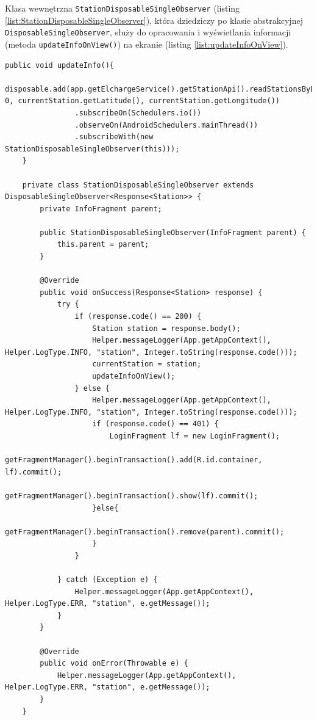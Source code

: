 Klasa wewnętrzna \texttt{StationDisposableSingleObserver} (listing \ref{list:StationDisposableSingleObserver}), która dziedziczy po klasie abstrakcyjnej \texttt{DisposableSingleObserver}, służy do opracowania i wyświetlania informacji (metoda \texttt{updateInfoOnView()}) na ekranie (listing \ref{list:updateInfoOnView}).
\begin{lstlisting}[label=list:StationDisposableSingleObserver,caption=Wczytanie danych stacji z części serwerowej,basicstyle=\tiny\ttfamily]
    public void updateInfo(){
        disposable.add(app.getElchargeService().getStationApi().readStationsByLatAndLng(0, 0, currentStation.getLatitude(), currentStation.getLongitude())
                .subscribeOn(Schedulers.io())
                .observeOn(AndroidSchedulers.mainThread())
                .subscribeWith(new StationDisposableSingleObserver(this)));
    }

    private class StationDisposableSingleObserver extends DisposableSingleObserver<Response<Station>> {
        private InfoFragment parent;

        public StationDisposableSingleObserver(InfoFragment parent) {
            this.parent = parent;
        }

        @Override
        public void onSuccess(Response<Station> response) {
            try {
                if (response.code() == 200) {
                    Station station = response.body();
                    Helper.messageLogger(App.getAppContext(), Helper.LogType.INFO, "station", Integer.toString(response.code()));
                    currentStation = station;
                    updateInfoOnView();
                } else {
                    Helper.messageLogger(App.getAppContext(), Helper.LogType.INFO, "station", Integer.toString(response.code()));
                    if (response.code() == 401) {
                        LoginFragment lf = new LoginFragment();
                        getFragmentManager().beginTransaction().add(R.id.container, lf).commit();
                        getFragmentManager().beginTransaction().show(lf).commit();
                    }else{
                        getFragmentManager().beginTransaction().remove(parent).commit();
                    }
                }

            } catch (Exception e) {
                Helper.messageLogger(App.getAppContext(), Helper.LogType.ERR, "station", e.getMessage());
            }
        }

        @Override
        public void onError(Throwable e) {
            Helper.messageLogger(App.getAppContext(), Helper.LogType.ERR, "station", e.getMessage());
        }
    }
\end{lstlisting}

